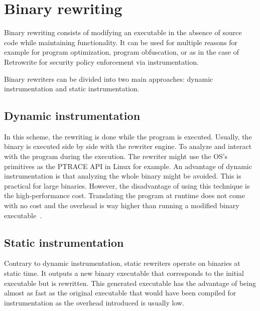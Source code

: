 \documentclass[a4paper,11pt,oneside]{report}
\newcommand{\sysname}{Retrowrite\xspace}
\begin{document}
\section{Binary rewriting}
Binary rewriting consists of modifying an executable in the absence of source
code while maintaining functionality. It can be used for multiple reasons 
for example for program optimization, program obfuscation, or as in the case of
\sysname for security policy enforcement via instrumentation. 


Binary rewriters can be divided into two main approaches: dynamic
instrumentation and static instrumentation.

\subsection{Dynamic instrumentation}
In this scheme, the rewriting is done while the program is executed. Usually,
the binary is executed side by side with the rewriter engine. To
analyze and interact with the program during the execution. The rewriter might
use the OS's primitives as the PTRACE API in Linux for example.  An advantage of
dynamic instrumentation is that analyzing the whole binary might be avoided.
This is practical for large binaries. However, the disadvantage of using this
technique is the high-performance cost. Translating the program at runtime does
not come with no cost and the overhead is way higher than running a modified
binary executable~\cite{dinesh20oakland}.


\subsection{Static instrumentation}
Contrary to dynamic instrumentation, static rewriters operate on binaries
at static time. It outputs a new binary executable that corresponds to the
initial executable but is rewritten. This generated executable has the advantage
of being almost as fast as the original executable that would have been
compiled for instrumentation as the overhead introduced is usually low.
\end{document}
